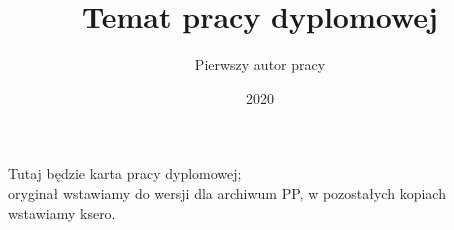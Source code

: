 \documentclass[11pt,a4paper,english,thesis]{dcsbook}
\begin{document}

\author{Pierwszy autor pracy}
\title{Temat pracy dyplomowej}
\date{2020}
\maketitle
\frontmatter



\thispagestyle{empty}\vspace*{\fill}%
\begin{center}Tutaj będzie karta pracy dyplomowej;\\oryginał wstawiamy do wersji dla archiwum PP, w pozostałych kopiach wstawiamy ksero.\end{center}%
\vfill\cleardoublepage%


\tableofcontents{}
\mainmatter











\backmatter

{\raggedright\sloppy\small}


% 


\end{document}

